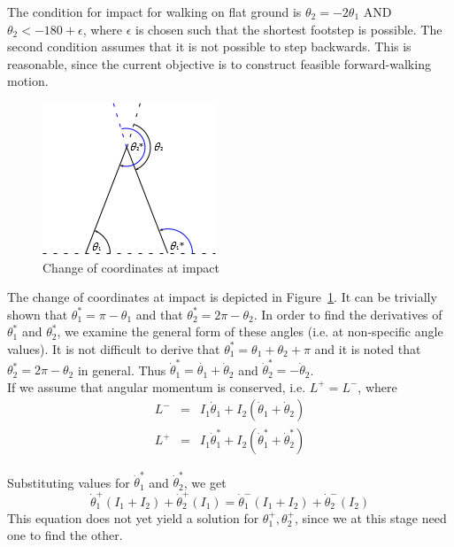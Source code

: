 The condition for impact for walking on flat ground is $\theta_2 = -2 \theta_1$ AND $\theta_2 < -180 + \epsilon$, where $\epsilon$ is chosen such that the shortest footstep is possible. The second condition assumes that it is not possible to step backwards. This is reasonable, since the current objective is to construct feasible forward-walking motion. \\ \par

\begin{figure}[htp]
	\centering
	\includegraphics[scale=1]{../images/impact.png}
	\caption{Change of coordinates at impact}
	\label{fig:changecoords}
\end{figure}

The change of coordinates at impact is depicted in Figure~\ref{fig:changecoords}. It can be trivially shown that $\theta_1^* = \pi - \theta_1$ and that $\theta_2^* = 2\pi - \theta_2$. In order to find the derivatives of $\theta_1^*$ and $\theta_2^*$, we examine the general form of these angles (i.e. at non-specific angle values). It is not difficult to derive that $\theta_1^* = \theta_1 + \theta_2 + \pi$ and it is noted that $\theta_2^* = 2\pi - \theta_2$ in general. Thus $\dot{\theta}_1^* = \dot{\theta_1} + \dot{\theta}_2$ and $\dot{\theta}_2^* = -\dot{\theta}_2$. \\

If we assume that angular momentum is conserved, i.e. $L^+ = L^-$, where
\begin{eqnarray*}
	L^- &=& I_1\dot{\theta}_1 + I_2\left(\dot{\theta}_1 + \dot{\theta}_2\right) \\
	L^+ &=& I_1\dot{\theta}_1^* + I_2\left(\dot{\theta}_1^* + \dot{\theta}_2^*\right)
\end{eqnarray*}
\par Substituting values for $\dot{\theta}_1^*$ and $\dot{\theta}_2^*$, we get
\begin{equation}
	\dot{\theta}_1^+\left(I_1 + I_2\right) + \dot{\theta}_2^+\left(I_1\right)
	= \dot{\theta}_1^-\left(I_1 + I_2\right) + \dot{\theta}_2^-\left(I_2\right)
\end{equation}
This equation does not yet yield a solution for $\theta_1^+, \theta_2^+$, since we at this stage need one to find the other.